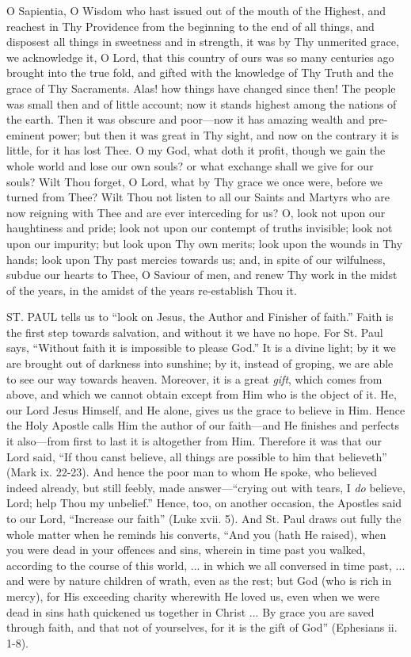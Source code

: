 O Sapientia, O Wisdom who hast
issued out of the mouth of the Highest, and reachest in Thy Providence
from the beginning to the end of all things, and disposest all things in
sweetness and in strength, it was by Thy unmerited grace, we acknowledge
it, O Lord, that this country of ours was so many centuries ago brought
into the true fold, and gifted with the knowledge of Thy Truth and the
grace of Thy Sacraments. Alas! how things have changed since then! The
people was small then and of little account; now it stands highest among
the nations of the earth. Then it was obscure and poor—now it has
amazing wealth and pre-eminent power; but then it was great in Thy
sight, and now on the contrary it is little, for it has lost Thee. O my
God, what doth it profit, though we gain the whole world and lose our
own souls? or what exchange shall we give for our souls? Wilt Thou
forget, O Lord, what by Thy grace we once were, before we turned
from Thee? Wilt Thou not listen to all our Saints and Martyrs who are
now reigning with Thee and are ever interceding for us? O, look not upon
our haughtiness and pride; look not upon our contempt of truths
invisible; look not upon our impurity; but look upon Thy own merits;
look upon the wounds in Thy hands; look upon Thy past mercies towards
us; and, in spite of our wilfulness, subdue our hearts to Thee, O
Saviour of men, and renew Thy work in the midst of the years, in the
amidst of the years re-establish Thou it.


ST. PAUL
tells us to ``look on Jesus, the Author and Finisher of faith.'' Faith is
the first step towards salvation, and without it we have no hope. For
St. Paul says, ``Without faith it is impossible to please God.'' It is a
divine light; by it we are brought out of darkness into sunshine; by it,
instead of groping, we are able to see our way towards heaven. Moreover,
it is a great \emph{gift}, which comes from above, and which we cannot
obtain except from Him who is the object of it. He, our Lord Jesus
Himself, and He alone, gives us the grace to believe in Him. Hence the
Holy Apostle calls Him the author of our faith—and He finishes and
perfects it also—from first to last it is altogether from Him.
Therefore it was that our Lord said, ``If thou canst believe, all things
are possible to him that believeth'' (Mark ix. 22-23). And hence the poor
man to whom He spoke, who believed indeed already, but still feebly,
made answer—``crying out with tears, I \emph{do} believe, Lord; help
Thou my unbelief.'' Hence, too, on another occasion, the Apostles said to
our Lord, ``Increase our faith'' (Luke xvii. 5). And St. Paul draws out
fully the whole matter when he reminds his converts, ``And you (hath He
raised), when you were dead in your offences and sins, wherein in time
past you walked, according to the course of this world, ... in which we all conversed in time past, ... and were by nature children of
wrath, even as the rest; but God (who is rich in mercy), for His
exceeding charity wherewith He loved us, even when we were dead in sins
hath quickened us together in Christ ... By grace you are saved through
faith, and that not of yourselves, for it is the gift of God'' (Ephesians
ii. 1-8).

